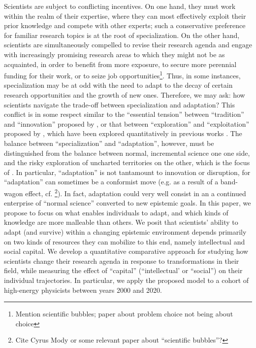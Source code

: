 \documentclass{article}
\begin{document}
Scientists are subject to conflicting incentives. On one hand, they must work within the realm of their expertise, where they can most effectively exploit their prior knowledge and compete with other experts; such a conservative preference for familiar research topics is at the root of specialization. On the other hand, scientists are simultaneously compelled to revise their research agenda and engage with increasingly promising research areas to which they might not be as acquainted, in order to benefit from more exposure, to secure more perennial funding for their work, or to seize job opportunities\footnote{Mention scientific bubbles; paper about problem choice not being about choice}. Thus, in some instances, specialization may be at odd with the need to adapt to the decay of certain research opportunities and the growth of new ones. Therefore, we may ask: how scientists navigate the trade-off between specialization and adaptation? This conflict is in some respect similar to the ``essential tension'' between ``tradition'' and ``innovation'' proposed by \citet{Kuhn1997}, or that between ``exploration'' and ``exploitation'' proposed by \citet{March1991}, which have been explored quantitatively in previous works \citep{Foster2015,Jia2017,Aleta2019,Chakresh2023}. The balance between ``specialization'' and ``adaptation'', however, must be distinguished from the balance between normal, incremental science one one side, and the risky exploration of uncharted territories on the other, which is the focus of \citet{Foster2015}. In particular, ``adaptation'' is not tantamount to innovation or disruption, for ``adaptation'' can sometimes be a conformist move (e.g. as a result of a band-wagon effect, cf. \citealt{Fujimura1988}\footnote{Cite Cyrus Mody or some relevant paper about ``scientific bubbles''?}). In fact, adaptation could very well consist in an a continued enterprise of ``normal science'' converted to new epistemic goals. In this paper, we propose to focus on what enables individuals to adapt, and which kinds of knowledge are more malleable than others. We posit that scientists' ability to adapt (and survive) within a changing epistemic environment depends primarily on two kinds of resources they can mobilize to this end, namely intellectual and social capital.  We develop a quantitative comparative approach for studying how scientists change their research agenda in response to transformations in their field, while measuring the effect of ``capital'' (``intellectual' or ``social'') on their individual trajectories. In particular, we apply the proposed model to a cohort of high-energy physicists between years 2000 and 2020.
\end{document}
